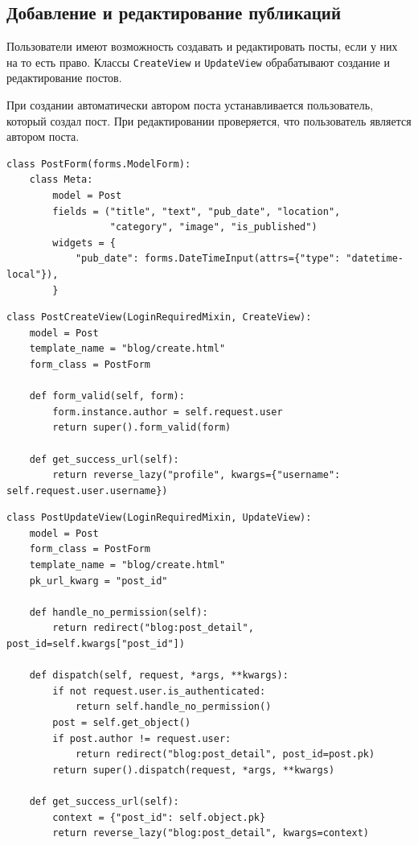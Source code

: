 \documentclass[bachelor, och, pract]{../SCWorks}
\begin{document}
\newpage
\subsection{Добавление и редактирование публикаций}

Пользователи имеют возможность создавать и редактировать посты, если у них на то есть право.
Классы \texttt{CreateView} и \texttt{UpdateView} обрабатывают создание и редактирование постов. 

При создании автоматически автором поста устанавливается пользователь, который создал пост. 
При редактировании проверяется, что пользователь является автором поста.

\begin{lstlisting}
class PostForm(forms.ModelForm):
    class Meta:
        model = Post
        fields = ("title", "text", "pub_date", "location",
                  "category", "image", "is_published")
        widgets = {
            "pub_date": forms.DateTimeInput(attrs={"type": "datetime-local"}),
        }
\end{lstlisting}

\begin{lstlisting}
class PostCreateView(LoginRequiredMixin, CreateView):
    model = Post
    template_name = "blog/create.html"
    form_class = PostForm

    def form_valid(self, form):
        form.instance.author = self.request.user
        return super().form_valid(form)

    def get_success_url(self):
        return reverse_lazy("profile", kwargs={"username": self.request.user.username})
\end{lstlisting}

\begin{lstlisting}
class PostUpdateView(LoginRequiredMixin, UpdateView):
    model = Post
    form_class = PostForm
    template_name = "blog/create.html"
    pk_url_kwarg = "post_id"

    def handle_no_permission(self):
        return redirect("blog:post_detail", post_id=self.kwargs["post_id"])

    def dispatch(self, request, *args, **kwargs):
        if not request.user.is_authenticated:
            return self.handle_no_permission()
        post = self.get_object()
        if post.author != request.user:
            return redirect("blog:post_detail", post_id=post.pk)
        return super().dispatch(request, *args, **kwargs)

    def get_success_url(self):
        context = {"post_id": self.object.pk}
        return reverse_lazy("blog:post_detail", kwargs=context)
\end{lstlisting}
\end{document}
